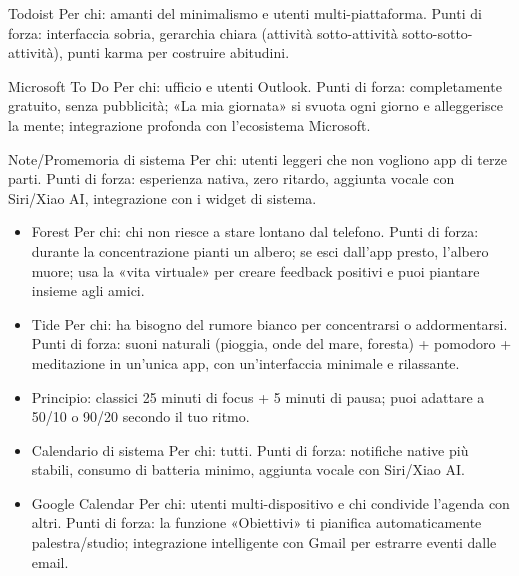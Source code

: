 Todoist Per chi: amanti del minimalismo e utenti multi-piattaforma. Punti di forza: interfaccia sobria, gerarchia chiara (attività sotto-attività sotto-sotto-attività), punti karma per costruire abitudini.

Microsoft To Do Per chi: ufficio e utenti Outlook. Punti di forza: completamente gratuito, senza pubblicità; «La mia giornata» si svuota ogni giorno e alleggerisce la mente; integrazione profonda con l'ecosistema Microsoft.

Note/Promemoria di sistema Per chi: utenti leggeri che non vogliono app di terze parti. Punti di forza: esperienza nativa, zero ritardo, aggiunta vocale con Siri/Xiao AI, integrazione con i widget di sistema.


\begin{itemize}
  \item Forest Per chi: chi non riesce a stare lontano dal telefono. Punti di forza: durante la concentrazione pianti un albero; se esci dall'app presto, l'albero muore; usa la «vita virtuale» per creare feedback positivi e puoi piantare insieme agli amici.
  \item Tide Per chi: ha bisogno del rumore bianco per concentrarsi o addormentarsi. Punti di forza: suoni naturali (pioggia, onde del mare, foresta) + pomodoro + meditazione in un'unica app, con un'interfaccia minimale e rilassante.
  \item Principio: classici 25 minuti di focus + 5 minuti di pausa; puoi adattare a 50/10 o 90/20 secondo il tuo ritmo.
\end{itemize}


\begin{itemize}
  \item Calendario di sistema Per chi: tutti. Punti di forza: notifiche native più stabili, consumo di batteria minimo, aggiunta vocale con Siri/Xiao AI.
  \item Google Calendar Per chi: utenti multi-dispositivo e chi condivide l'agenda con altri. Punti di forza: la funzione «Obiettivi» ti pianifica automaticamente palestra/studio; integrazione intelligente con Gmail per estrarre eventi dalle email.
\end{itemize}


